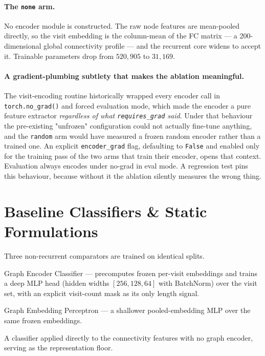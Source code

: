 \paragraph{The \texttt{none} arm.} No encoder module is constructed. The raw node features
are mean-pooled directly, so the visit embedding is the column-mean of the FC matrix --- a
200-dimensional global connectivity profile --- and the recurrent core widens to accept it.
Trainable parameters drop from $520{,}905$ to $31{,}169$.

\paragraph{A gradient-plumbing subtlety that makes the ablation meaningful.} The
visit-encoding routine historically wrapped every encoder call in \texttt{torch.no\_grad()}
and forced evaluation mode, which made the encoder a pure feature extractor \emph{regardless
of what \texttt{requires\_grad} said}. Under that behaviour the pre-existing
"unfrozen" configuration could not actually fine-tune anything, and the \texttt{random} arm
would have measured a frozen random encoder rather than a trained one. An explicit
\texttt{encoder\_grad} flag, defaulting to \texttt{False} and enabled only for the training
pass of the two arms that train their encoder, opens that context. Evaluation always encodes
under no-grad in eval mode. A regression test pins this behaviour, because without it the
ablation silently measures the wrong thing.


\section{Baseline Classifiers \& Static Formulations}
\label{sec:static-baselines}

Three non-recurrent comparators are trained on identical splits.

\begin{description}[leftmargin=2.6cm,style=nextline]
  \item[GEC] Graph Encoder Classifier --- precomputes frozen per-visit embeddings and trains
    a deep MLP head (hidden widths $[256, 128, 64]$ with BatchNorm) over the visit set,
    with an explicit visit-count mask as its only length signal.
  \item[GEP] Graph Embedding Perceptron --- a shallower pooled-embedding MLP over the same
    frozen embeddings.
  \item[Raw FC] A classifier applied directly to the connectivity features with no graph
    encoder, serving as the representation floor.
\end{description}

